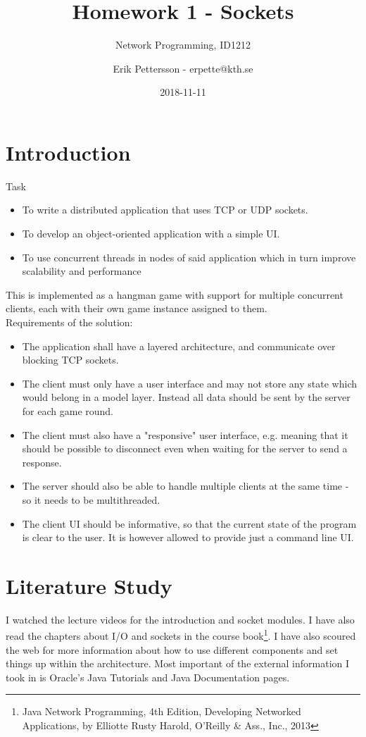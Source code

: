 \documentclass[a4paper]{scrartcl}
\title{Homework 1 - Sockets}
\subtitle{Network Programming, ID1212}
\author{Erik Pettersson - erpette@kth.se}
\date{2018-11-11}
\begin{document}
\maketitle

\section{Introduction}

Task
\begin{itemize}
	\item{To write a distributed application that uses TCP or UDP sockets.}
	\item{To develop an object-oriented application with a simple UI.}
	\item{To use concurrent threads in nodes of said application which in turn improve scalability and performance}
\end{itemize}

This is implemented as a hangman game with support for multiple concurrent clients, each with their own game instance assigned to them.\\

Requirements of the solution:
\begin{itemize}
	\item{The application shall have a layered architecture, and communicate over blocking TCP sockets.}
	\item{The client must only have a user interface and may not store any state which would belong in a model layer. Instead all data should be sent by the server for each game round.}
	\item{The client must also have a "responsive" user interface, e.g. meaning that it should be possible to disconnect even when waiting for the server to send a response.}
	\item{The server should also be able to handle multiple clients at the same time - so it needs to be multithreaded.}
	\item{The client UI should be informative, so that the current state of the program is clear to the user. It is however allowed to provide just a command line UI.}
\end{itemize}

\section{Literature Study}

I watched the lecture videos for the introduction and socket modules. I have also read the chapters about I/O and sockets in the course book\footnote{Java Network Programming, 4th Edition, Developing Networked Applications, by Elliotte Rusty Harold, O'Reilly \& Ass., Inc., 2013}. I have also scoured the web for more information about how to use different components and set things up within the architecture. Most important of the external information I took in is Oracle’s Java Tutorials and Java Documentation pages.
\end{document}
